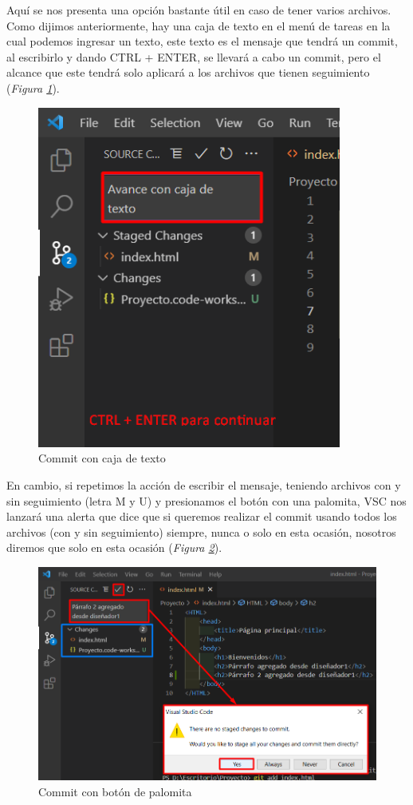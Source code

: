 Aquí se nos presenta una opción bastante útil en caso de tener varios archivos. Como dijimos anteriormente, hay una caja de texto en el menú de tareas en la cual podemos ingresar un texto, este texto es el mensaje que tendrá un commit, al escribirlo y dando CTRL + ENTER, se llevará a cabo un commit, pero el alcance que este tendrá solo aplicará a los archivos que tienen seguimiento (\textit{Figura \ref{fig: 21}}).
\begin{figure}[H]
    \centering
    \caption{Commit con caja de texto}
    \label{fig: 21}
    \includegraphics[width=10cm]{capturas/commits1.png}
\end{figure}

En cambio, si repetimos la acción de escribir el mensaje, teniendo archivos con y sin seguimiento (letra M y U) y presionamos el botón con una palomita, VSC nos lanzará una alerta que dice que si queremos realizar el commit usando todos los archivos (con y sin seguimiento) siempre, nunca o solo en esta ocasión, nosotros diremos que solo en esta ocasión (\textit{Figura \ref{fig: 22}}).
\begin{figure}[H]
    \centering
    \caption{Commit con botón de palomita}
    \label{fig: 22}
    \includegraphics[width=13cm]{capturas/commits2.png}
\end{figure}

